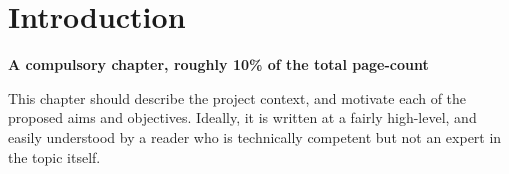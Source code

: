 \documentclass[ %
                    author={James Stephenson},
                supervisor={Dr. Edwin Simpson},
                    degree={MSc},
                     title={Bayesian Deep Learning For Extractive Test Summarisation},
                  subtitle={},
                      type={},
                      year={2023}]{../additions/dissertation}
\begin{document}
		
		
	
	\mainmatter
	
	
	\chapter{Introduction}
	\label{chap:introduction}
		
		{\bf A compulsory chapter, roughly 10\% of the total page-count}
		\vspace{1cm} 
		
		\noindent
		This chapter should describe the project context, and motivate each of
		the proposed aims and objectives.  Ideally, it is written at a fairly 
		high-level, and easily understood by a reader who is technically 
		competent but not an expert in the topic itself.
		
\end{document}
